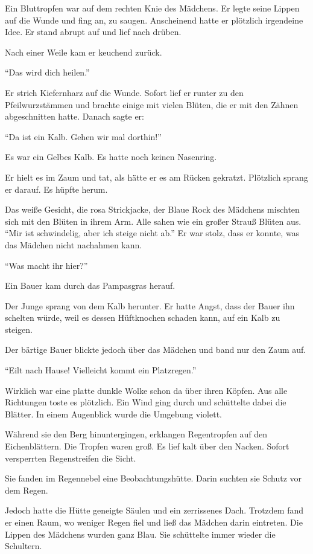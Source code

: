 \documentclass[prd,a4paper,12pt,tightenlines,notitlepage,nofootinbib]{revtex4-1}
\begin{document}
Ein Bluttropfen war auf
dem rechten Knie des Mädchens.  Er legte seine Lippen auf die Wunde und fing an,
zu saugen.  Anscheinend hatte er plötzlich irgendeine Idee.  Er stand abrupt auf
und lief nach drüben.

Nach einer Weile kam er keuchend zurück.

"`Das wird dich heilen."'

Er strich Kiefernharz auf die Wunde.  Sofort
lief er runter zu den Pfeilwurzstämmen und brachte einige mit vielen
Blüten, die er mit den Zähnen abgeschnitten hatte.  Danach sagte er:

"`Da ist ein Kalb. Gehen wir mal dorthin!"'

Es war ein Gelbes Kalb.  Es hatte noch keinen
Nasenring.

Er hielt es im Zaum und tat, als hätte er es am Rücken
gekratzt.  Plötzlich sprang er darauf.  Es hüpfte herum.

Das weiße Gesicht, die rosa Strickjacke, der Blaue Rock des
Mädchens mischten sich mit den Blüten in ihrem Arm.  Alle sahen wie
ein großer Strauß Blüten aus.  "`Mir ist schwindelig, aber ich steige nicht
ab."'  Er war stolz, dass er konnte, was das Mädchen nicht nachahmen kann.

"`Was macht ihr hier?"'

Ein Bauer kam durch das Pampasgras herauf.

Der
Junge sprang von dem Kalb herunter.  Er hatte Angst, dass der Bauer ihn schelten
würde, weil es dessen Hüftknochen schaden kann, auf ein Kalb zu steigen.

Der
bärtige Bauer blickte jedoch über das Mädchen und band nur den Zaum
auf.

"`Eilt nach Hause!  Vielleicht kommt ein Platzregen."'

Wirklich
war eine platte dunkle Wolke schon da über ihren Köpfen. Aus alle
Richtungen toste es plötzlich.  Ein Wind ging durch und
schüttelte dabei die Blätter.  In einem Augenblick wurde die Umgebung violett.

Während sie den Berg hinuntergingen, erklangen Regentropfen
auf den Eichenblättern.
Die Tropfen waren groß.  Es lief kalt über den Nacken. %
Sofort versperrten Regenstreifen die Sicht.

Sie fanden im
Regennebel eine Beobachtungshütte.  Darin suchten sie Schutz vor dem Regen.

Jedoch hatte die Hütte geneigte Säulen und ein zerrissenes
Dach.  Trotzdem fand er einen Raum, wo weniger Regen fiel und ließ das Mädchen
darin eintreten.  Die Lippen des Mädchens wurden ganz Blau.
Sie schüttelte immer wieder die Schultern.
\end{document}
